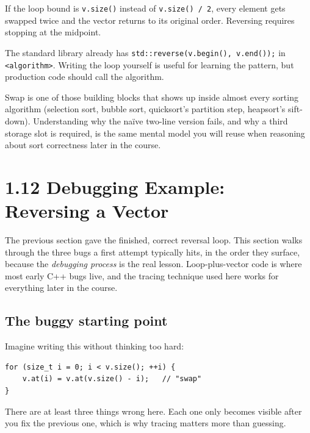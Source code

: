 \documentclass[11pt]{article}
\begin{document}
\begin{warnbox}
If the loop bound is \texttt{v.size()} instead of \texttt{v.size() / 2},
every element gets swapped twice and the vector returns to its original
order. Reversing requires stopping at the midpoint.
\end{warnbox}

\begin{notebox}
The standard library already has \texttt{std::reverse(v.begin(), v.end());}
in \texttt{<algorithm>}. Writing the loop yourself is useful for learning
the pattern, but production code should call the algorithm.
\end{notebox}

\begin{ideabox}
Swap is one of those building blocks that shows up inside almost every
sorting algorithm (selection sort, bubble sort, quicksort's partition
step, heapsort's sift-down). Understanding why the na\"ive two-line
version fails, and why a third storage slot is required, is the same
mental model you will reuse when reasoning about sort correctness later
in the course.
\end{ideabox}

\section{1.12 Debugging Example: Reversing a Vector}

The previous section gave the finished, correct reversal loop. This
section walks through the three bugs a first attempt typically hits, in
the order they surface, because the \emph{debugging process} is the real
lesson. Loop-plus-vector code is where most early C++ bugs live, and the
tracing technique used here works for everything later in the course.

\subsection{The buggy starting point}

Imagine writing this without thinking too hard:

\begin{examplebox}
\begin{verbatim}
for (size_t i = 0; i < v.size(); ++i) {
    v.at(i) = v.at(v.size() - i);   // "swap"
}
\end{verbatim}
There are at least three things wrong here. Each one only becomes visible
after you fix the previous one, which is why tracing matters more than
guessing.
\end{examplebox}
\end{document}
